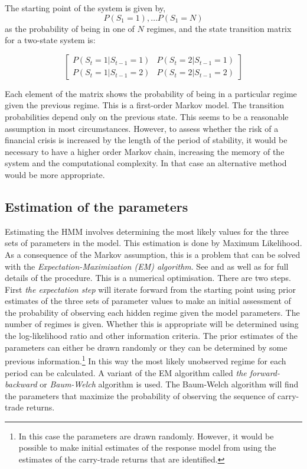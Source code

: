 \documentclass[12pt, a4paper, oneside]{article}\usepackage[]{graphicx}\usepackage[]{color}
\begin{document}
The starting point of the system is given by,
\begin{equation}
P(S_1 = 1), \dots P(S_1 = N)
\end{equation}
as the probability of being in one of $N$ regimes, and the state transition matrix for a two-state system is:

\begin{equation}
\begin{bmatrix}
P(S_t = 1|S_{t-1}=1)  & P(S_t = 2|S_{t-1}=1)\\
P(S_t = 1|S_{t-1}=2)  & P(S_t = 2|S_{t-1}=2)
\end{bmatrix}
\label{eqref:transmat}
\end{equation}

  Each element of the matrix shows the probability of being in a particular regime given the previous regime. This is a first-order Markov model.  The transition probabilities depend only on the previous state. This seems to be a reasonable assumption in most circumstances.  However, to assess whether the risk of a financial crisis is increased by the length of the period of stability, it would be necessary to have a higher order Markov chain, increasing the memory of the system and the computational complexity.  In that case an alternative method would be more appropriate. 

\subsection{Estimation of the parameters}
Estimating the HMM involves determining the most likely values for the three sets of parameters in the model.  This estimation is done by Maximum Likelihood. As a consequence of the Markov assumption, this is a problem that can be solved with the \emph{Expectation-Maximization (EM) algorithm}.  See \citet{dempster1977maximum} and \citet{Hamilton1989} as well as \citet{depmixS4} for full details of the procedure.  This is a numerical optimisation.  There are two steps. First \emph{the expectation step} will iterate forward from the starting point using prior estimates of the three sets of parameter values  to make an initial assessment of the probability of observing each hidden regime given the model parameters.  The number of regimes is given. Whether this is appropriate will be determined using the log-likelihood ratio and other information criteria.  The prior estimates of the parameters can either be drawn randomly or they can be determined by some previous information.\footnote{In this case the parameters are drawn randomly.  However, it would be possible to make initial estimates of the response model from \citet{Hayward2013} using the estimates of the carry-trade returns that are identified.}  In this way the most likely unobserved regime for each period can be calculated. A variant of the EM algorithm called \emph{the forward-backward} or \emph{Baum-Welch} algorithm \citet{Baum1970} is used.   The Baum-Welch algorithm will find the parameters that maximize the probability of observing the sequence of carry-trade returns.  
\end{document}
